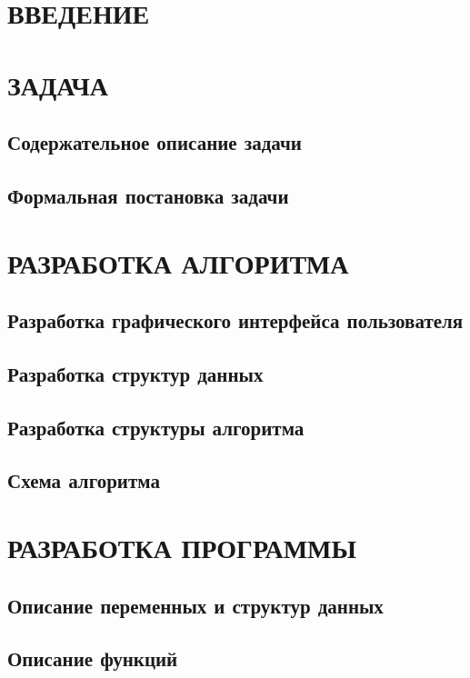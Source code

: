 

\normalfont
\tableofcontents
\clearpage
\section*{ВВЕДЕНИЕ}
\clearpage
\section{ЗАДАЧА}
\subsection{Содержательное описание задачи}
\subsection{Формальная постановка задачи}
\section{РАЗРАБОТКА АЛГОРИТМА}
\subsection{Разработка графического интерфейса пользователя}
\subsection{Разработка структур данных}
\subsection{Разработка структуры алгоритма}
\subsection{Схема алгоритма}
\section{РАЗРАБОТКА ПРОГРАММЫ}
\subsection{Описание переменных и структур данных}
\subsection{Описание функций}
